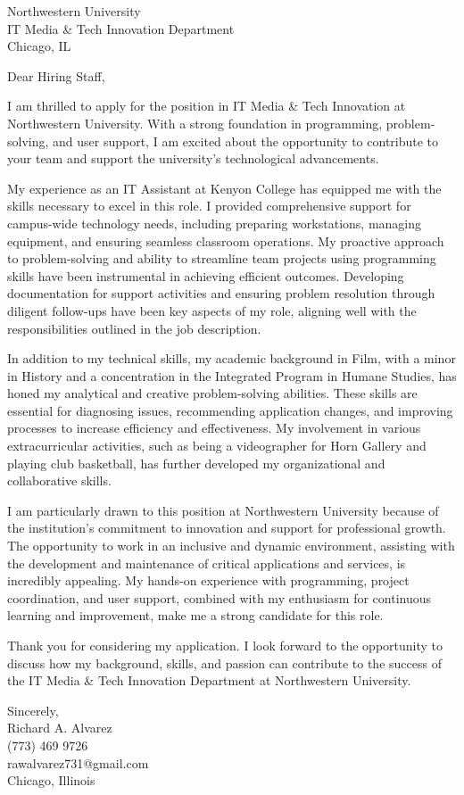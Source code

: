 \documentclass[a4paper,10pt]{letter}
\begin{document}
\begin{letter}{Northwestern University \\
IT Media \& Tech Innovation Department \\
Chicago, IL}

\opening{Dear Hiring Staff,}

I am thrilled to apply for the position in IT Media \& Tech Innovation at Northwestern University. With a strong foundation in programming, problem-solving, and user support, I am excited about the opportunity to contribute to your team and support the university's technological advancements.

My experience as an IT Assistant at Kenyon College has equipped me with the skills necessary to excel in this role. I provided comprehensive support for campus-wide technology needs, including preparing workstations, managing equipment, and ensuring seamless classroom operations. My proactive approach to problem-solving and ability to streamline team projects using programming skills have been instrumental in achieving efficient outcomes. Developing documentation for support activities and ensuring problem resolution through diligent follow-ups have been key aspects of my role, aligning well with the responsibilities outlined in the job description.

In addition to my technical skills, my academic background in Film, with a minor in History and a concentration in the Integrated Program in Humane Studies, has honed my analytical and creative problem-solving abilities. These skills are essential for diagnosing issues, recommending application changes, and improving processes to increase efficiency and effectiveness. My involvement in various extracurricular activities, such as being a videographer for Horn Gallery and playing club basketball, has further developed my organizational and collaborative skills.

I am particularly drawn to this position at Northwestern University because of the institution's commitment to innovation and support for professional growth. The opportunity to work in an inclusive and dynamic environment, assisting with the development and maintenance of critical applications and services, is incredibly appealing. My hands-on experience with programming, project coordination, and user support, combined with my enthusiasm for continuous learning and improvement, make me a strong candidate for this role.

Thank you for considering my application. I look forward to the opportunity to discuss how my background, skills, and passion can contribute to the success of the IT Media \& Tech Innovation Department at Northwestern University.

\vspace{1em}

Sincerely, \\ 
Richard A. Alvarez \\
(773) 469 9726 \\
rawalvarez731@gmail.com \\
Chicago, Illinois

\end{letter}
\end{document}

